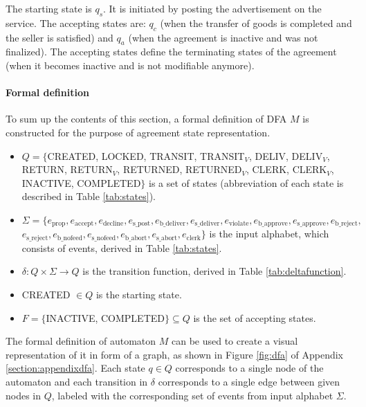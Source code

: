The starting state is $q_s$. It is initiated by posting the advertisement on the service. The accepting states are: $q_c$ (when the transfer of goods is completed and the seller is satisfied) and $q_a$ (when the agreement is inactive and was not finalized). The accepting states define the terminating states of the agreement (when it becomes inactive and is not modifiable anymore). 

\paragraph{Formal definition}
To sum up the contents of this section, a formal definition of DFA $M$ is constructed for the purpose of agreement state representation.

\begin{itemize}
\item $Q = \{${\tiny CREATED}, {\tiny LOCKED}, {\tiny TRANSIT}, {\tiny TRANSIT$_V$}, {\tiny DELIV}, {\tiny DELIV$_V$}, {\tiny RETURN}, {\tiny RETURN$_V$}, {\tiny RETURNED}, {\tiny RETURNED$_V$}, {\tiny CLERK}, {\tiny CLERK$_V$}, {\tiny INACTIVE}, {\tiny COMPLETED}$\}$ is a set of states (abbreviation of each state is described in  Table \ref{tab:states}).
\item $\Sigma = \{e_{\mathrm{prop}}, e_{\mathrm{accept}}, e_{\mathrm{decline}}, e_{\mathrm{s\_post}}, e_{\mathrm{b\_deliver}}, e_{\mathrm{s\_deliver}}, e_{\mathrm{violate}}, e_{\mathrm{b\_approve}}, e_{\mathrm{s\_approve}}, e_{\mathrm{b\_reject}}, $\\$  e_{\mathrm{s\_reject}}, e_{\mathrm{b\_nofeed}}, e_{\mathrm{s\_nofeed}}, e_{\mathrm{b\_abort}}, e_{\mathrm{s\_abort}}, e_{\mathrm{clerk}}\}$ is the input alphabet, which consists of events, derived in Table \ref{tab:states}.
\item $\delta: Q \times \Sigma \rightarrow Q$ is the transition function, derived in Table \ref{tab:deltafunction}.
\item {\tiny CREATED} $\in Q$ is the starting state.
\item $F = \{${\tiny INACTIVE}, {\tiny COMPLETED}$\} \subseteq Q$ is the set of accepting states.
\end{itemize}

The formal definition of automaton $M$ can be used to create a visual representation of it in form of a graph, as shown in Figure \ref{fig:dfa} of Appendix \ref{section:appendixdfa}. Each state $q \in Q$ corresponds to a single node of the automaton and each transition in $\delta$ corresponds to a single edge between given nodes in $Q$, labeled with the corresponding set of events from input alphabet $\Sigma$. 